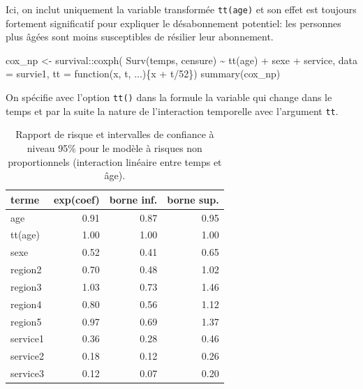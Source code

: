 \documentclass[
  11pt,
  letterpaper,
]{scrbook}
\newenvironment{Shaded}{\begin{snugshade}}{\end{snugshade}}
\newcommand{\AttributeTok}[1]{\textcolor[rgb]{0.40,0.45,0.13}{#1}}
\newcommand{\ControlFlowTok}[1]{\textcolor[rgb]{0.00,0.23,0.31}{#1}}
\newcommand{\DecValTok}[1]{\textcolor[rgb]{0.68,0.00,0.00}{#1}}
\newcommand{\FunctionTok}[1]{\textcolor[rgb]{0.28,0.35,0.67}{#1}}
\newcommand{\NormalTok}[1]{\textcolor[rgb]{0.00,0.23,0.31}{#1}}
\newcommand{\OtherTok}[1]{\textcolor[rgb]{0.00,0.23,0.31}{#1}}
\newcommand{\SpecialCharTok}[1]{\textcolor[rgb]{0.37,0.37,0.37}{#1}}
\theoremstyle{definition}
\theoremstyle{remark}
\begin{document}
Ici, on inclut uniquement la variable transformée \texttt{tt(age)} et
son effet est toujours fortement significatif pour expliquer le
désabonnement potentiel: les personnes plus âgées sont moins
susceptibles de résilier leur abonnement.

\begin{Shaded}
\begin{Highlighting}[]
\NormalTok{cox\_np }\OtherTok{\textless{}{-}}\NormalTok{ survival}\SpecialCharTok{::}\FunctionTok{coxph}\NormalTok{(}
    \FunctionTok{Surv}\NormalTok{(temps, censure) }\SpecialCharTok{\textasciitilde{}} 
     \FunctionTok{tt}\NormalTok{(age) }\SpecialCharTok{+}\NormalTok{ sexe }\SpecialCharTok{+}\NormalTok{ service, }
     \AttributeTok{data =}\NormalTok{ survie1, }
     \AttributeTok{tt =} \ControlFlowTok{function}\NormalTok{(x, t, ...)\{x }\SpecialCharTok{+}\NormalTok{ t}\SpecialCharTok{/}\DecValTok{52}\NormalTok{\})}
\FunctionTok{summary}\NormalTok{(cox\_np)}
\end{Highlighting}
\end{Shaded}

On spécifie avec l'option \texttt{tt()} dans la formule la variable qui
change dans le temps et par la suite la nature de l'interaction
temporelle avec l'argument \texttt{tt}.

\hypertarget{tbl-cox-np}{}
\begin{table}
\caption{\label{tbl-cox-np}Rapport de risque et intervalles de confiance à niveau 95\% pour le
modèle à risques non proportionnels (interaction linéaire entre temps et
âge). }\tabularnewline

\centering
\begin{tabular}{lrrr}
\toprule
terme & exp(coef) & borne inf. & borne sup.\\
\midrule
age & 0.91 & 0.87 & 0.95\\
tt(age) & 1.00 & 1.00 & 1.00\\
sexe & 0.52 & 0.41 & 0.65\\
region2 & 0.70 & 0.48 & 1.02\\
region3 & 1.03 & 0.73 & 1.46\\
\addlinespace
region4 & 0.80 & 0.56 & 1.12\\
region5 & 0.97 & 0.69 & 1.37\\
service1 & 0.36 & 0.28 & 0.46\\
service2 & 0.18 & 0.12 & 0.26\\
service3 & 0.12 & 0.07 & 0.20\\
\bottomrule
\end{tabular}
\end{table}
\end{document}
